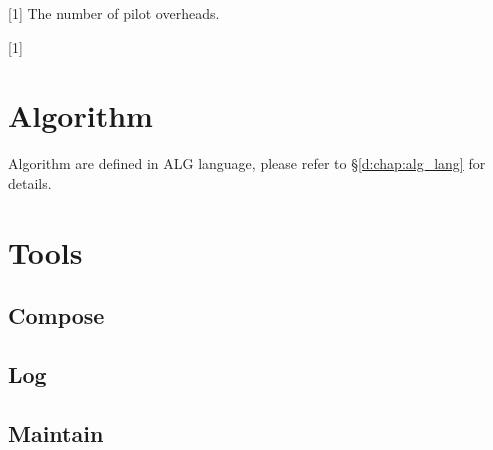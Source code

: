[1]
The number of pilot overheads.

[1]


\section{Algorithm}

Algorithm are defined in ALG language,
please refer to \S\ref{d:chap:alg_lang} for details.

\section{Tools}

\subsection{Compose}

\subsection{Log}

\subsection{Maintain}
